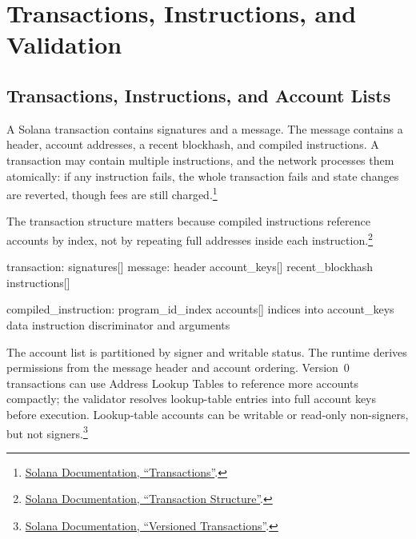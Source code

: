 \section{Transactions, Instructions, and Validation}

\subsection{Transactions, Instructions, and Account Lists}

A Solana transaction contains signatures and a message. The message contains a header, account addresses, a recent blockhash, and compiled instructions. A transaction may contain multiple instructions, and the network processes them atomically: if any instruction fails, the whole transaction fails and state changes are reverted, though fees are still charged.\footnote{\href{https://solana.com/docs/core/transactions}{Solana Documentation, ``Transactions''}.}

The transaction structure matters because compiled instructions reference accounts by index, not by repeating full addresses inside each instruction.\footnote{\href{https://solana.com/docs/core/transactions/transaction-structure}{Solana Documentation, ``Transaction Structure''}.}

\begin{codeblock}
transaction:
    signatures[]
    message:
        header
        account_keys[]
        recent_blockhash
        instructions[]

compiled_instruction:
    program_id_index
    accounts[]       indices into account_keys
    data             instruction discriminator and arguments
\end{codeblock}

The account list is partitioned by signer and writable status. The runtime derives permissions from the message header and account ordering. Version~0 transactions can use Address Lookup Tables to reference more accounts compactly; the validator resolves lookup-table entries into full account keys before execution. Lookup-table accounts can be writable or read-only non-signers, but not signers.\footnote{\href{https://solana.com/docs/core/transactions/versioned-transactions}{Solana Documentation, ``Versioned Transactions''}.}

